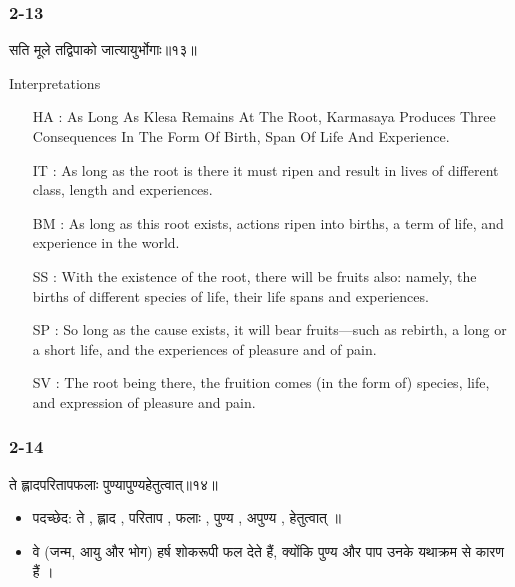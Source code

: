 \begin{frame}[fragile]\frametitle{2-13}
\begin{sanskrit}
सति मूले तद्विपाको जात्यायुर्भोगाः॥१३॥
\end{sanskrit}

Interpretations
\begin{itemize}
\item [HA]: As Long As Klesa Remains At The Root, Karmasaya Produces Three Consequences In The Form Of Birth, Span Of Life And Experience.
\item [IT]: As long as the root is there it must ripen and result in lives of different class, length and experiences.
\item [BM]: As long as this root exists, actions ripen into births, a term of life, and experience in the world.
\item [SS]: With the existence of the root, there will be fruits also: namely, the births of different species of life, their life spans and experiences.
\item [SP]: So long as the cause exists, it will bear fruits—such as rebirth, a long or a short life, and the experiences of pleasure and of pain.
\item [SV]: The root being there, the fruition comes (in the form of) species, life, and expression of pleasure and pain. 
\end{itemize}
	
\end{frame}

\begin{frame}[fragile]\frametitle{2-14}
\begin{sanskrit}
ते ह्लादपरितापफलाः पुण्यापुण्यहेतुत्वात्॥१४॥
\end{sanskrit}

\begin{itemize}
\item पदच्छेद: ते , ह्लाद , परिताप , फलाः , पुण्य , अपुण्य , हेतुत्वात् ॥
\item वे (जन्म, आयु और भोग) हर्ष शोकरूपी फल देते हैं, क्योंकि पुण्य और पाप उनके यथाक्रम से कारण हैं ।
\end{itemize}
	
\end{frame}

